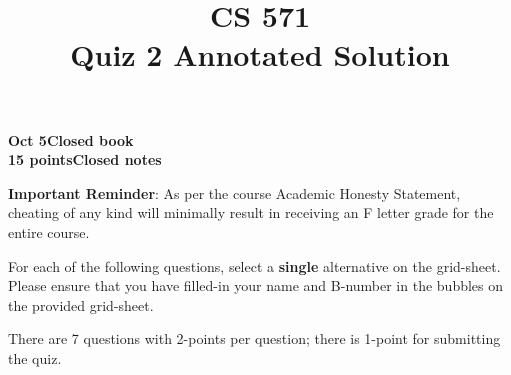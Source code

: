 \documentclass[12pt]{article}
\title{CS 571\\Quiz 2 Annotated Solution}
\date{}
\begin{document}
\maketitle

\begin{flushleft}
\textbf{Oct 5}\hfill\textbf{Closed book}\\
\textbf{15 points}\hfill\textbf{Closed notes}\\

\vspace{0.5cm}

\textbf{Important Reminder}: As per the course Academic Honesty
Statement, cheating of any kind will minimally result in receiving an
F letter grade for the entire course.


\end{flushleft}

For each of the following questions, select a \textbf{single}
alternative on the grid-sheet.  Please ensure that you have filled-in
your name and B-number in the bubbles on the provided grid-sheet.

There are 7 questions with 2-points per question; there is 1-point
for submitting the quiz.
\end{document}
